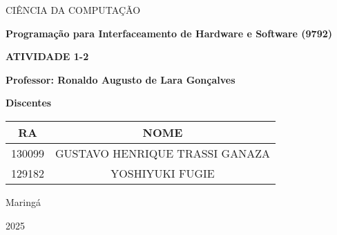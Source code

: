 \begin{titlepage}
\begin{center}
       {CIÊNCIA DA COMPUTAÇÃO}

       \vspace{2cm}
       
       \textbf{Programação para Interfaceamento de Hardware e Software (9792)}
  
       \vspace{1cm}

       \textbf{ATIVIDADE 1-2}

       \vfill
       
       \textbf{Professor: Ronaldo Augusto de Lara Gonçalves}
       
       \vspace{1cm}

       \textbf{Discentes}
       \begin{table}[h]
           \centering
           \begin{tabular}{|c|c|}\hline
                RA & NOME \\ \hline
                130099 & GUSTAVO HENRIQUE TRASSI GANAZA\\ \hline
                129182 & YOSHIYUKI FUGIE \\ \hline
            \end{tabular}
       \end{table}

            Maringá
            
            2025
\end{center}
\end{titlepage}